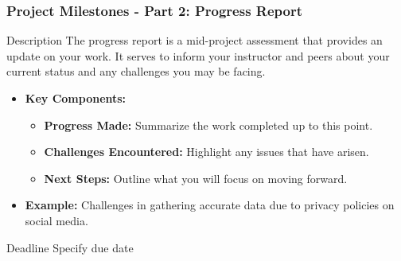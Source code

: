 \documentclass[aspectratio=169]{beamer}
\begin{document}
\begin{frame}[fragile]
    \frametitle{Project Milestones - Part 2: Progress Report}
    \begin{block}{Description}
        The progress report is a mid-project assessment that provides an update on your work. It serves to inform your instructor and peers about your current status and any challenges you may be facing.
    \end{block}

    \begin{itemize}
        \item \textbf{Key Components:}
            \begin{itemize}
                \item \textbf{Progress Made:} Summarize the work completed up to this point.
                \item \textbf{Challenges Encountered:} Highlight any issues that have arisen.
                \item \textbf{Next Steps:} Outline what you will focus on moving forward.
            \end{itemize}
        \item \textbf{Example:} Challenges in gathering accurate data due to privacy policies on social media.
    \end{itemize}
    
    \begin{block}{Deadline}
        Specify due date
    \end{block}
\end{frame}
\end{document}
